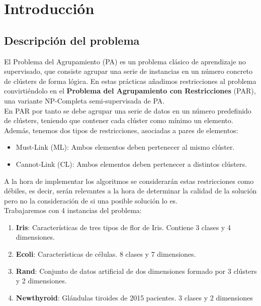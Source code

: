 \section{Introducción}

\subsection{Descripción del problema}

El Problema del Agrupamiento (PA) es un problema clásico de aprendizaje no supervisado, que consiste agrupar una serie de instancias en un número concreto de clústers de forma lógica. En estas prácticas añadimos restricciones al problema convirtiéndolo en el \textbf{Problema del Agrupamiento con Restricciones} (PAR), una variante NP-Completa semi-supervisada de PA. \\

En PAR por tanto se debe agrupar una serie de datos en un número predefinido de clústers, teniendo que contener cada clúster como mínimo un elemento.
Además, tenemos dos tipos de restricciones, asociadas a pares de elementos:
\begin{itemize}
    \item Must-Link (ML): Ambos elementos deben pertenecer al mismo clúster.
    \item Cannot-Link (CL): Ambos elementos deben pertenecer a distintos clústers.
\end{itemize}

A la hora de implementar los algoritmos se considerarán estas restricciones como débiles, es decir, serán relevantes a la hora de determinar la calidad de la solución pero no la consideración de si una posible solución lo es. \\

Trabajaremos con 4 instancias del problema:
\begin{enumerate}
    \item \textbf{Iris}: Características de tres tipos de flor de Iris. Contiene 3 clases y 4 dimensiones.
    \item \textbf{Ecoli}: Características de células. 8 clases y 7 dimensiones.
    \item \textbf{Rand}: Conjunto de datos artificial de dos dimensiones formado por 3 clústers y 2 dimensiones.
    \item \textbf{Newthyroid}: Glándulas tiroides de 2015 pacientes. 3 clases y 2 dimensiones
\end{enumerate}

